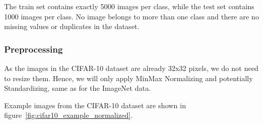 The train set contains exactly 5000 images per class, while the test set contains 1000 images per class.
No image belongs to more than one class and there are no missing values or duplicates in the dataset.

\subsubsection{Preprocessing}
As the images in the CIFAR-10 dataset are already 32x32 pixels, we do not need to resize them.
Hence, we will only apply MinMax Normalizing and potentially Standardizing, same as for the ImageNet data.

Example images from the CIFAR-10 dataset are shown in figure~\ref{fig:cifar10_example_normalized}.
